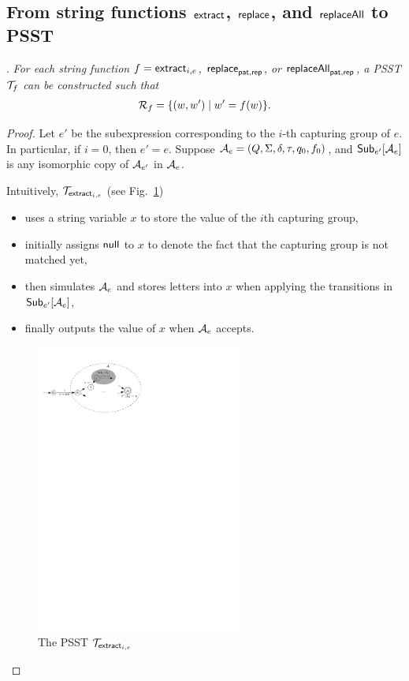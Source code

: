 \subsection{From string functions $\mathsf{extract}$, $\mathsf{replace}$, and $\mathsf{replaceAll}$ to PSST}\label{appendix:sec-extract-replace-to-psst}


    \medskip

    .
    \emph{For each string function $f = \mathsf{extract}_{i,e}$, $\mathsf{replace}_{\mathsf{pat}, \mathsf{rep}}$, or $\mathsf{replaceAll}_{\mathsf{pat}, \mathsf{rep}}$, a PSST $\mathcal{T}_f$ can be constructed such that
    $$\mathcal{R}_{f} = \{(w, w') \mid w'= f(w)\}.$$}

    \begin{proof}
        Let $e'$ be the subexpression corresponding to the $i$-th capturing group of $e$. In particular, if $i=0$, then $e' = e$.
        Suppose $\mathcal{A}_e = (Q, \Sigma, \delta, \tau, q_0, f_0)$, and ${\sf Sub}_{e'}[\mathcal{A}_e]$ is any isomorphic copy of $\mathcal{A}_{e'}$ in $\mathcal{A}_e$.

        Intuitively, $\mathcal{T}_{\mathsf{extract}_{i,e}}$ (see Fig.~\ref{fig-psst-extract})
        \begin{itemize}
            \item uses a string variable $x$ to store the value of the $i$th capturing group,
            \item initially assigns $\mathsf{null}$ to $x$ to denote the fact that the capturing group is not matched yet,
            \item then simulates $\mathcal{A}_e$ and stores letters into $x$ when applying the transitions in ${\sf Sub}_{e'}[\mathcal{A}_e]$,
            \item finally outputs the value of $x$ when $\mathcal{A}_e$ accepts.
        \end{itemize}

        \begin{figure}[ht]
            \centering
            \includegraphics[width = 0.6\textwidth]{psst-extract.pdf}
            \caption{The PSST $\mathcal{T}_{\mathsf{extract}_{i,e}}$}
            \label{fig-psst-extract}
        \end{figure}


\end{proof}

